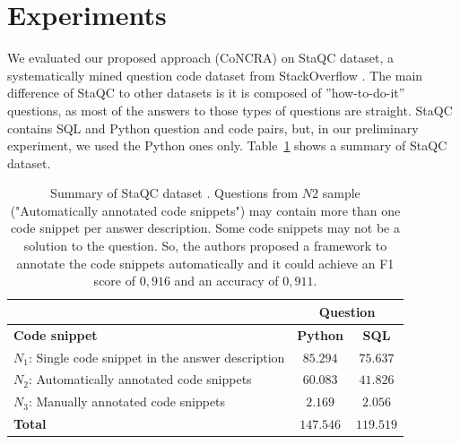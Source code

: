 \documentclass[sigconf]{acmart}
\begin{document}
\section{Experiments}

We evaluated our proposed approach (CoNCRA) on StaQC dataset, a systematically mined question code dataset from StackOverflow \cite{yao-2018}. The main difference of StaQC to other datasets is it is composed of ''how-to-do-it'' questions, as most of the answers to those types of questions are straight. StaQC contains SQL and Python question and code pairs, but, in our preliminary experiment, we used the Python ones only. Table~\ref{table:summary-training-data-yao-staqc} shows a summary of StaQC dataset.

\begin{table}[h]
\centering
\begin{tabular}{ p{5cm} c c }
\hline
  & \multicolumn{2}{c}{\textbf{Question}}\\
\hline
\textbf{Code snippet} & \textbf{Python} & \textbf{SQL}  \\
\hline

$N_{1}$: Single code snippet in the answer description & $85.294$ & $75.637$ \\

$N_{2}$: Automatically annotated code snippets & $60.083$ & $41.826$ \\

$N_{3}$: Manually annotated code snippets & $2.169$ & $2.056$  \\

 \hline
 \textbf{Total} & $\bm{147.546}$ & $\bm{119.519}$\\
 \hline 
 
\end{tabular}
\caption{Summary of StaQC dataset \cite{yao-2018}. Questions from $N2$ sample ("Automatically annotated code snippets") may contain more than one code snippet per answer description. Some code snippets may not be a solution to the question. So, the authors proposed a framework to annotate the code snippets automatically and it could achieve an F1 score of $0,916$ and an accuracy of $0,911$.}
\label{table:summary-training-data-yao-staqc}
\end{table}
\end{document}
